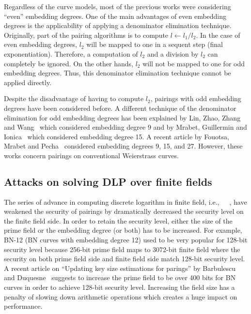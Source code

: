 Regardless of the curve models, most of the previous works were considering ``even'' embedding degrees.
One of the main advantages of even embedding degrees is the applicability of applying a denominator elimination technique.
Originally, part of the pairing algorithms is to compute $l \leftarrow l_1/l_2$.
In the case of even embedding degrees, $l_2$ will be mapped to one in a sequent step (final exponentiation).
Therefore, a computation of $l_2$ and a division by $l_2$ can completely be ignored.
On the other hands, $l_2$ will not be mapped to one for odd embedding degrees.
Thus, this denominator elimination technique cannot be applied directly.

Despite the disadvantage of having to compute $l_2$,
pairings with odd embedding degrees have been considered before.
A different technique of the denominator elimination for odd embedding degrees has been explained by
Lin, Zhao, Zhang and Wang~\cite{2008/lin} which considered embedding degree 9 and by
Mrabet, Guillermin and Ionica~\cite{2009/deg15} which considered embedding degree 15.
A recent article by Fouotsa, Mrabet and Pecha~\cite{2016/degodd} considered embedding degrees 9, 15, and 27.
However, these works concern pairings on conventional Weierstrass curves.


\subsection{Attacks on solving DLP over finite fields}

The series of advance in computing discrete logarithm in finite field,
i.e.,~\cite{2016/KB}~\cite{2015/BGGM}~\cite{2015/BGK},
have weakened the security of pairings by dramatically decreased the security level on the finite field side.
In order to retain the security level, either the size of the prime field or the embedding degree (or both) has to be increased.
For example, BN-12 (BN curves with embedding degree 12) used to be very popular for 128-bit security level
because 256-bit prime field maps to 3072-bit finite field
where the security on both prime field side and finite field side match 128-bit security level.
A recent article on ``Updating key size estimations for parings'' by Barbulescu and Duquesne~\cite{2017/keysize}
suggests to increase the prime field to be over 400 bits for BN curves in order to achieve 128-bit security level.
Increasing the field size has a penalty of slowing down arithmetic operations which creates a huge impact on performance.


